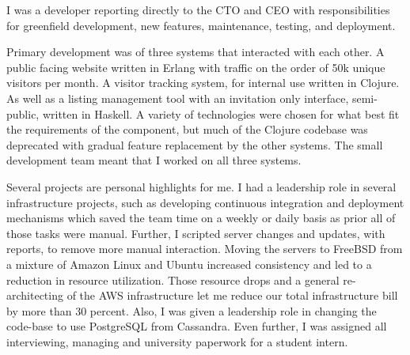 \documentclass[margintitle,line]{res}
\begin{document}
\begin{resume}
\begin{position}
  I was a developer reporting directly to the CTO and CEO with responsibilities
  for greenfield development, new features, maintenance, testing, and deployment.

  Primary development was of three systems that interacted with each other.
  A public facing website  written in Erlang with traffic on the order of 50k
  unique visitors per month. A visitor tracking system, for internal use written
  in Clojure. As well as a listing management tool with an invitation only
  interface, semi-public, written in Haskell. A variety of technologies were
  chosen for what best fit the requirements of the component, but much of the
  Clojure codebase was deprecated with gradual feature replacement by the other
  systems. The small development team meant that I worked on all three systems.



  Several projects are personal highlights for me. I had a leadership role
  in several infrastructure projects, such as developing continuous integration
  and deployment mechanisms which saved the team time on a weekly or daily basis
  as prior all of those tasks were manual. Further, I scripted server changes
  and updates, with reports, to remove more manual interaction. Moving the
  servers to FreeBSD from a mixture of Amazon Linux and Ubuntu increased
  consistency and led to a reduction in resource utilization. Those resource
  drops and a general re-architecting of the AWS infrastructure let me
  reduce our total infrastructure bill by more than 30 percent. Also, I was
  given a leadership role in changing the code-base to use PostgreSQL from Cassandra.
  Even further, I was assigned all interviewing, managing and university paperwork
  for a student intern.


\end{position}
\end{resume}
\end{document}
